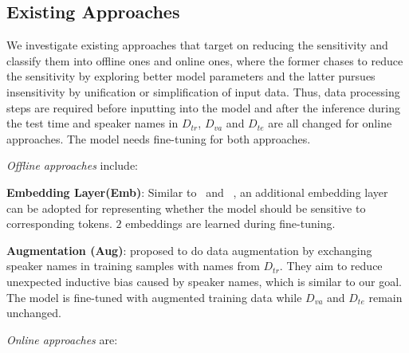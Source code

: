 

\subsection{Existing Approaches}

We investigate existing approaches that target on reducing the sensitivity and classify them into offline ones and online ones, where the former chases to reduce the sensitivity by exploring better model parameters and the latter pursues insensitivity by unification or simplification of input data. Thus, data processing steps are required before inputting into the model and after the inference during the test time and speaker names in $D_{tr}$, $D_{va}$ and $D_{te}$ are all changed for online approaches.
The model needs fine-tuning for both approaches. 


\textit{Offline approaches} include:


\textbf{Embedding Layer(Emb)}: Similar to~\cite{gu2020speaker} and ~\cite{heetal2021speakerturn}, an additional embedding layer can be adopted for representing whether the model should be sensitive to corresponding tokens. $2$ embeddings are learned during fine-tuning. 

\textbf{Augmentation (Aug)}: \citet{liu2021controllable} proposed to do data augmentation by exchanging speaker names in training samples with names from $D_{tr}$. They aim to reduce unexpected inductive bias caused by speaker names, which is similar to our goal. The model is fine-tuned with augmented training data while $D_{va}$ and $D_{te}$ remain unchanged.



\textit{Online approaches} are:

